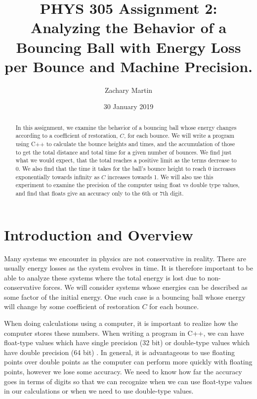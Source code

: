\documentclass[aps,prl,twocolumn,superscriptaddress]{revtex4-1}
\begin{document}
\title{PHYS 305 Assignment 2: Analyzing the Behavior of a Bouncing Ball with Energy Loss per Bounce and Machine Precision.}
\author{Zachary Martin}
\date{30 January 2019}

\begin{abstract}
In this assignment, we examine the behavior of a bouncing ball whose energy changes according to a coefficient of restoration, $C$, for each bounce. We will write a program using C++ to calculate the bounce heights and times, and the accumulation of those to get the total distance and total time for a given number of bounces. We find just what we would expect, that the total reaches a positive limit as the terms decrease to 0. We also find that the time it takes for the ball's bounce height to reach 0 increases exponentially towards infinity as $C$ increases towards 1. We will also use this experiment to examine the precision of the computer using float vs double type values, and find that floats give an accuracy only to the 6th or 7th digit.
\end{abstract}

\maketitle

\section{Introduction and Overview}
Many systems we encounter in physics are not conservative in reality. There are usually energy losses as the system evolves in time. It is therefore important to be able to analyze these systems where the total energy is lost due to non-conservative forces. We will consider systems whose energies can be described as some factor of the initial energy. One such case is a bouncing ball whose energy will change by some coefficient of restoration $C$ for each bounce. 

When doing calculations using a computer, it is important to realize how the computer stores these numbers. When writing a program in C++, we can have float-type values which have single precision (32 bit) or double-type values which have double precision (64 bit) \cite{Laulima}. In general, it is advantageous to use floating points over double points as the computer can perform more quickly with floating points, however we lose some accuracy. We need to know how far the accuracy goes in terms of digits so that we can recognize when we can use float-type values in our calculations or when we need to use double-type values.
\end{document}

